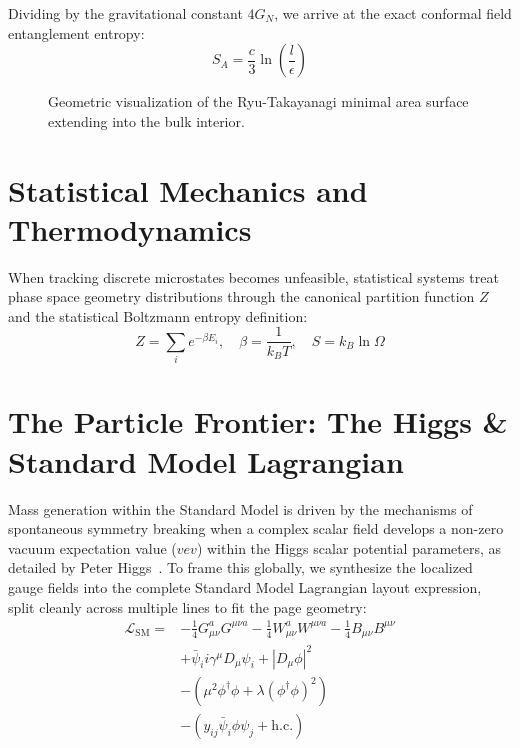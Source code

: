 \documentclass[11pt,a4paper]{article}
\begin{document}
Dividing by the gravitational constant $4G_N$, we arrive at the exact conformal field entanglement entropy:
\begin{equation}
S_A = \frac{c}{3} \ln\left( \frac{l}{\epsilon} \right)
\end{equation}
\begin{figure}[h!]
\centering
{}
\caption{Geometric visualization of the Ryu-Takayanagi minimal area surface extending into the bulk interior.}
\end{figure}
\section{Statistical Mechanics and Thermodynamics}
When tracking discrete microstates becomes unfeasible, statistical systems treat phase space geometry distributions through the canonical partition function $Z$ and the statistical Boltzmann entropy definition:
\begin{equation}
Z = \sum_i e^{-\beta E_i}, \quad \beta = \frac{1}{k_B T}, \quad S = k_B \ln \Omega
\end{equation}
\section{The Particle Frontier: The Higgs \& Standard Model Lagrangian}
Mass generation within the Standard Model is driven by the mechanisms of spontaneous symmetry breaking when a complex scalar field develops a non-zero vacuum expectation value ($vev$) within the Higgs scalar potential parameters, as detailed by Peter Higgs~\cite{Higgs1964}. To frame this globally, we synthesize the localized gauge fields into the complete Standard Model Lagrangian layout expression, split cleanly across multiple lines to fit the page geometry:
\begin{equation}
\begin{aligned}
\mathcal{L}_{\text{SM}} = & -\frac{1}{4}G_{\mu\nu}^a G^{\mu\nu a} - \frac{1}{4}W_{\mu\nu}^a W^{\mu\nu a} - \frac{1}{4}B_{\mu\nu}B^{\mu\nu} \\
& + \bar{\psi}_i i\gamma^\mu D_\mu \psi_i + |D_\mu \phi|^2 \\
& - (\mu^2 \phi^\dagger \phi + \lambda(\phi^\dagger \phi)^2) \\
& - (y_{ij}\bar{\psi}_i \phi \psi_j + \text{h.c.})
\end{aligned}
\end{equation}
\end{document}
